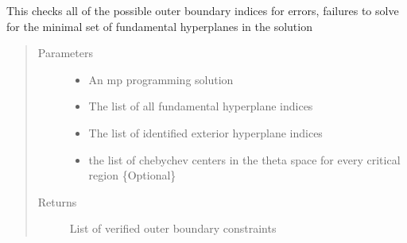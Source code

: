 \documentclass[letterpaper,10pt,english]{sphinxmanual}
\begin{document}
\begin{fulllineitems}
\label{\detokenize{ppopt.upop:ppopt.upop.upop_utils.verify_outer_boundary}}
\sphinxAtStartPar
This checks all of the possible outer boundary indices for errors, failures to solve for the minimal set of fundamental hyperplanes in the solution
\begin{quote}\begin{description}
\item[{Parameters}] \leavevmode\begin{itemize}
\item {} 
\sphinxAtStartPar
{} \textendash{} An mp programming solution

\item {} 
\sphinxAtStartPar
{} \textendash{} The list of all fundamental hyperplane indices

\item {} 
\sphinxAtStartPar
{} \textendash{} The list of identified exterior hyperplane indices

\item {} 
\sphinxAtStartPar
{} \textendash{} the list of chebychev centers in the theta space for every critical region \{Optional\}

\end{itemize}

\item[{Returns}] \leavevmode
\sphinxAtStartPar
List of verified outer boundary constraints

\end{description}\end{quote}

\end{fulllineitems}
\end{document}

